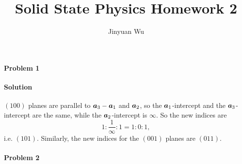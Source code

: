 \documentclass[hyperref, a4paper]{article}
\title{Solid State Physics Homework 2}
\author{Jinyuan Wu}
\begin{document}
\maketitle

\paragraph{Problem 1}

\paragraph{Solution} $(100)$ planes are parallel to $\vb*{a}_3 - \vb*{a}_1$ and $\vb*{a}_2$,
so the $\vb*{a}_1$-intercept and the $\vb*{a}_3$-intercept are the same,
while the $\vb*{a}_2$-intercept is $\infty$.
So the new indices are 
\[
    1 : \frac{1}{\infty} : 1 = 1 : 0 : 1,
\]
i.e. $(101)$. Similarly, the new indices for the $(001)$ planes are $(011)$.

\paragraph{Problem 2}
\end{document}

